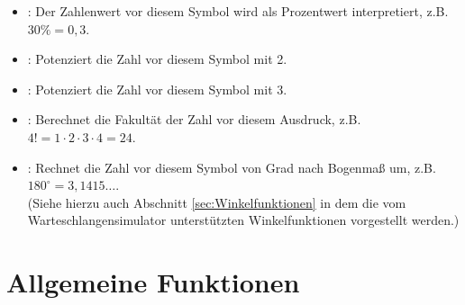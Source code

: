 \begin{itemize}
\item
\cmd{\%}:
Der Zahlenwert vor diesem Symbol wird als Prozentwert interpretiert,
z.B.\ $30\%=0{,}3$.

\item
{}:
Potenziert die Zahl vor diesem Symbol mit 2.

\item
{}:
Potenziert die Zahl vor diesem Symbol mit 3.

\item
\cmd{!}:
Berechnet die Fakultät der Zahl vor diesem Ausdruck, z.B.\ $4!=1\cdot2\cdot3\cdot4=24$.

\item
\cmd{$^{\circ}$}:
Rechnet die Zahl vor diesem Symbol von Grad nach Bogenmaß um, z.B.\ $180^{\circ}=3{,}1415\ldots$.\\
(Siehe hierzu auch Abschnitt \ref{sec:Winkelfunktionen} in dem die vom
Warteschlangensimulator unterstützten Winkelfunktionen vorgestellt werden.)
\end{itemize}



\chapter{Allgemeine Funktionen}

